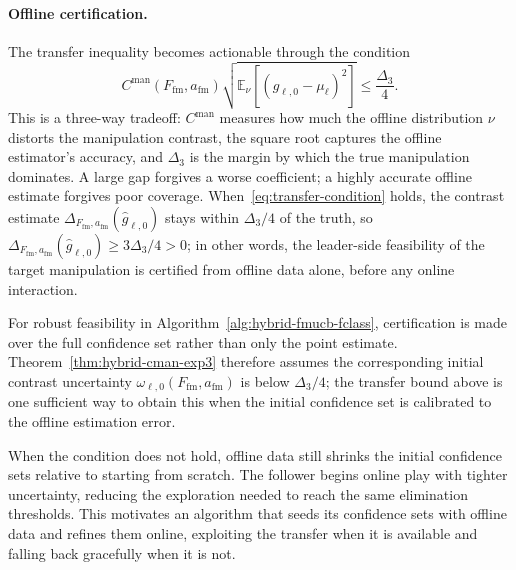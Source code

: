 \documentclass{article}
\newcommand{\E}{\mathbb{E}}           %
\begin{document}
\paragraph{Offline certification.}
The transfer inequality becomes actionable through the condition
\begin{equation}
C^{\mathrm{man}}(F_{\mathrm{fm}},a_{\mathrm{fm}})\sqrt{\E_\nu[(\widehat g_{\ell,0}-\mu_\ell)^2]}
\le \frac{\Delta_3}{4}.
\label{eq:transfer-condition}
\end{equation}
This is a three-way tradeoff: $C^{\mathrm{man}}$ measures how much the offline distribution $\nu$ distorts the manipulation contrast, the square root captures the offline estimator's accuracy, and $\Delta_3$ is the margin by which the true manipulation dominates. A large gap forgives a worse coefficient; a highly accurate offline estimate forgives poor coverage. When~\eqref{eq:transfer-condition} holds, the contrast estimate $\Delta_{F_{\mathrm{fm}},a_{\mathrm{fm}}}(\widehat g_{\ell,0})$ stays within $\Delta_3/4$ of the truth, so $\Delta_{F_{\mathrm{fm}},a_{\mathrm{fm}}}(\widehat g_{\ell,0})\ge 3\Delta_3/4>0$; in other words, the leader-side feasibility of the target manipulation is certified from offline data alone, before any online interaction.

For robust feasibility in Algorithm~\ref{alg:hybrid-fmucb-fclass}, certification is made over the full confidence set rather than only the point estimate. Theorem~\ref{thm:hybrid-cman-exp3} therefore assumes the corresponding initial contrast uncertainty $\omega_{\ell,0}(F_{\mathrm{fm}},a_{\mathrm{fm}})$ is below $\Delta_3/4$; the transfer bound above is one sufficient way to obtain this when the initial confidence set is calibrated to the offline estimation error.

When the condition does not hold, offline data still shrinks the initial confidence sets relative to starting from scratch. The follower begins online play with tighter uncertainty, reducing the exploration needed to reach the same elimination thresholds. This motivates an algorithm that seeds its confidence sets with offline data and refines them online, exploiting the transfer when it is available and falling back gracefully when it is not.
\end{document}
